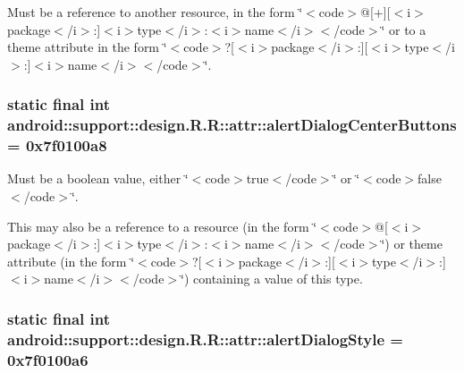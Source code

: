 Must be a reference to another resource, in the form \char`\"{}$<$code$>$@\mbox{[}+\mbox{]}\mbox{[}$<$i$>$package$<$/i$>$:\mbox{]}$<$i$>$type$<$/i$>$:$<$i$>$name$<$/i$>$$<$/code$>$\char`\"{} or to a theme attribute in the form \char`\"{}$<$code$>$?\mbox{[}$<$i$>$package$<$/i$>$:\mbox{]}\mbox{[}$<$i$>$type$<$/i$>$:\mbox{]}$<$i$>$name$<$/i$>$$<$/code$>$\char`\"{}. \hypertarget{classandroid_1_1support_1_1design_1_1_r_1_1attr_d417b4f0752f5b3600480255d9b4ea54}{
\subsubsection[{alertDialogCenterButtons}]{\setlength{\rightskip}{0pt plus 5cm}static final int android::support::design.R.R::attr::alertDialogCenterButtons = 0x7f0100a8}}
\label{classandroid_1_1support_1_1design_1_1_r_1_1attr_d417b4f0752f5b3600480255d9b4ea54}


Must be a boolean value, either \char`\"{}$<$code$>$true$<$/code$>$\char`\"{} or \char`\"{}$<$code$>$false$<$/code$>$\char`\"{}. 

This may also be a reference to a resource (in the form \char`\"{}$<$code$>$@\mbox{[}$<$i$>$package$<$/i$>$:\mbox{]}$<$i$>$type$<$/i$>$:$<$i$>$name$<$/i$>$$<$/code$>$\char`\"{}) or theme attribute (in the form \char`\"{}$<$code$>$?\mbox{[}$<$i$>$package$<$/i$>$:\mbox{]}\mbox{[}$<$i$>$type$<$/i$>$:\mbox{]}$<$i$>$name$<$/i$>$$<$/code$>$\char`\"{}) containing a value of this type. \hypertarget{classandroid_1_1support_1_1design_1_1_r_1_1attr_1a886d958147488f2540177dce2d8c3b}{
\subsubsection[{alertDialogStyle}]{\setlength{\rightskip}{0pt plus 5cm}static final int android::support::design.R.R::attr::alertDialogStyle = 0x7f0100a6}}
\label{classandroid_1_1support_1_1design_1_1_r_1_1attr_1a886d958147488f2540177dce2d8c3b}


